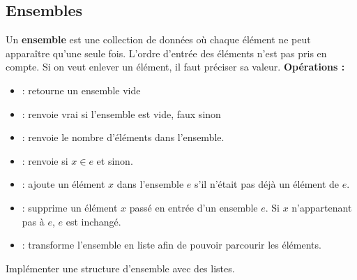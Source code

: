 \subsection{Ensembles}
Un {\bf ensemble} est une collection de données où chaque élément ne peut apparaître qu'une seule fois. L'ordre d'entrée des éléments n'est pas pris en compte. Si on veut enlever un élément, il faut préciser sa valeur.
{\bf Opérations :}
\begin{itemize}
\item {} : retourne un ensemble vide 
\item {} : renvoie vrai si l'ensemble est vide, faux sinon
\item {} : renvoie le nombre d'éléments dans l'ensemble.
\item {} : renvoie  si $x\in e$ et  sinon.
\item {} : ajoute un élément $x$ dans l'ensemble $e$ s'il n'était pas déjà un élément de $e$.
\item {} : supprime un élément $x$ passé en entrée d'un ensemble $e$. Si $x$ n'appartenant pas à $e$, $e$ est inchangé.
\item {} : transforme l'ensemble en liste afin de pouvoir parcourir les éléments.
\end{itemize}
\begin{Exercise}[title = {Ensemble avec des listes}]\it 

Implémenter une structure d'ensemble avec des listes.
\end{Exercise} 
